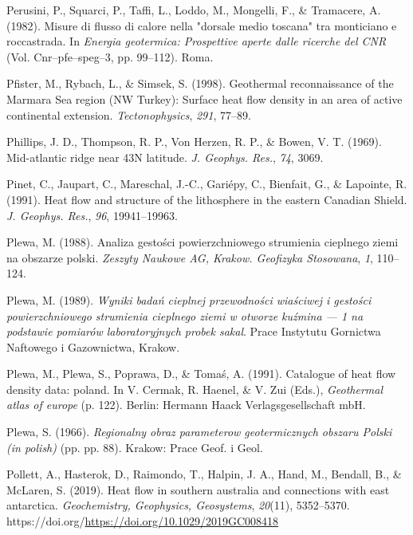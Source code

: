 \documentclass[draft,linenumbers]{agujournal2018}
\begin{document}
\leavevmode{}%
Perusini, P., Squarci, P., Taffi, L., Loddo, M., Mongelli, F., \&
Tramacere, A. (1982). Misure di flusso di calore nella "dorsale medio
toscana" tra monticiano e roccastrada. In \emph{Energia geotermica:
Prospettive aperte dalle ricerche del CNR} (Vol. Cnr--pfe--speg--3, pp.
99--112). Roma.

\leavevmode{}%
Pfister, M., Rybach, L., \& Simsek, S. (1998). Geothermal reconnaissance
of the {Marmara Sea} region {(NW Turkey)}: Surface heat flow density in
an area of active continental extension. \emph{Tectonophysics},
\emph{291}, 77--89.

\leavevmode{}%
Phillips, J. D., Thompson, R. P., Von Herzen, R. P., \& Bowen, V. T.
(1969). Mid-atlantic ridge near 43N latitude. \emph{J. Geophys. Res.},
\emph{74}, 3069.

\leavevmode{}%
Pinet, C., Jaupart, C., Mareschal, J.-C., Gariépy, C., Bienfait, G., \&
Lapointe, R. (1991). Heat flow and structure of the lithosphere in the
eastern {Canadian Shield}. \emph{J. Geophys. Res.}, \emph{96},
19941--19963.

\leavevmode{}%
Plewa, M. (1988). Analiza gesto{ś}ci powierzchniowego strumienia
cieplnego ziemi na obszarze polski. \emph{Zeszyty Naukowe AG, Krakow.
Geofizyka Stosowana}, \emph{1}, 110--124.

\leavevmode{}%
Plewa, M. (1989). \emph{Wyniki bada{ń} cieplnej przewodno{ś}ci
wia{ś}ciwej i gesto{ś}ci powierzchniowego strumienia cieplnego ziemi w
otworze ku{ź}mina --- 1 na podstawie pomiar{ó}w laboratoryjnych probek
saka{l}}. Prace Instytutu Gornictwa Naftowego i Gazownictwa, Krakow.

\leavevmode{}%
Plewa, M., Plewa, S., Poprawa, D., \& Tomaś, A. (1991). Catalogue of
heat flow density data: poland. In V. Cermak, R. Haenel, \& V. Zui
(Eds.), \emph{Geothermal atlas of europe} (p. 122). Berlin: Hermann
Haack Verlagsgesellschaft mbH.

\leavevmode{}%
Plewa, S. (1966). \emph{Regionalny obraz parameterow geotermicznych
obszaru {Polski} (in polish)} (pp. pp. 88). Krakow: Prace Geof. i Geol.

\leavevmode{}%
Pollett, A., Hasterok, D., Raimondo, T., Halpin, J. A., Hand, M.,
Bendall, B., \& McLaren, S. (2019). Heat flow in southern australia and
connections with east antarctica. \emph{Geochemistry, Geophysics,
Geosystems}, \emph{20}(11), 5352--5370.
https://doi.org/\url{https://doi.org/10.1029/2019GC008418}
\end{document}
